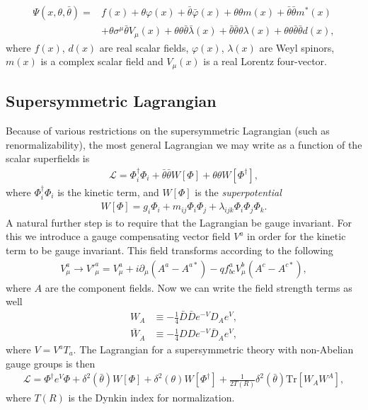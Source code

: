 \documentclass[twoside,english]{uiofysmaster}
\begin{document}
\begin{align}
\Psi (x, \theta, \bar{\theta}) =& f(x) + \theta \varphi (x) + \bar{\theta} \bar{\varphi} (x) + \theta \theta m(x) + \bar{\theta} \bar{\theta} m^* (x)\\
&+ \theta \sigma^{\mu} \bar{\theta} V_{\mu} (x) + \theta \theta \bar{\theta} \bar{\lambda} (x) + \bar{\theta} \bar{\theta} \theta \lambda (x) + \theta \theta \bar{\theta} \bar{\theta} d(x),
\end{align}
where $f(x)$, $d(x)$ are real scalar fields, $\varphi (x)$, $\lambda (x)$ are Weyl spinors, $m(x)$ is a complex scalar field and $V_{\mu} (x)$ is a real Lorentz four-vector.

\subsection{Supersymmetric Lagrangian}

Because of various restrictions on the supersymmetric Lagrangian (such as renormalizability), the most general Lagrangian we may write as a function of the scalar superfields is
\begin{align}
\mathcal{L} = \Phi_i^{\dagger} \Phi_i + \bar{\theta} \bar{\theta} W[\Phi] + \theta \theta W[\Phi^{\dagger}],
\end{align}
where $\Phi_i^{\dagger} \Phi_i$ is the kinetic term, and $W[\Phi]$ is the \textit{superpotential}
\begin{align}\label{Eq:: superpotential}
W[\Phi] = g_i \Phi_i + m_{ij} \Phi_i \Phi_j + \lambda_{ijk} \Phi_i \Phi_j \Phi_k.
\end{align}
A natural further step is to require that the Lagrangian be gauge invariant. For this we introduce a gauge compensating vector field $V^a$ in order for the kinetic term to be gauge invariant. This field transforms according to the following
\begin{align}
V^a_{\mu} \rightarrow V'^a_{\mu} = V_{\mu}^a + i \partial_{\mu} (A^a - A^{a*}) - q f_{bc}^a V_{\mu}^b (A^c - A^{c*}),
\end{align}
where $A$ are the component fields. Now we can write the field strength terms as well
\begin{align}
W_A & \equiv - \frac{1}{4} \bar{D} \bar{D} e^{-V} D_A e^V,\\
\bar{W}_{\dot{A}} & \equiv - \frac{1}{4} DDe^{-V}\bar{D}_{\dot{A}} e^V,
\end{align}
where $V = V^a T_a$. The Lagrangian for a supersymmetric theory with non-Abelian gauge groups is then
\begin{align}
\mathcal{L} = \Phi^{\dagger} e^{V} \Phi + \delta^2 (\bar{\theta}) W[\Phi] + \delta^2 (\theta) W[\Phi^{\dagger}] + \frac{1}{2T(R)} \delta^2 (\bar{\theta}) \text{Tr}[W_AW^A],
\end{align}
where $T(R)$ is the Dynkin index for normalization.
\end{document}
